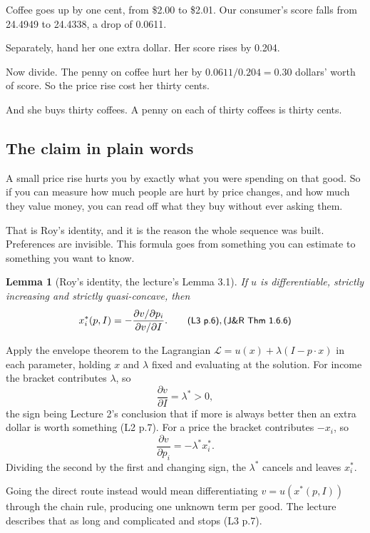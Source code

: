 \documentclass[11pt,letterpaper]{article}
\theoremstyle{definition}
\theoremstyle{plain}
\newtheorem{lem}{Lemma}
\newcommand{\src}[1]{{\small\textsf{(#1)}}}
\newcommand{\skipnote}{\noindent{\small\textsf{Proof. Skippable on a first read.}}\par\smallskip}
\begin{document}
Coffee goes up by one cent, from \$2.00 to \$2.01. Our consumer's score falls from 24.4949 to
24.4338, a drop of 0.0611.

Separately, hand her one extra dollar. Her score rises by 0.204.

Now divide. The penny on coffee hurt her by $0.0611 / 0.204 = 0.30$ dollars' worth of score. So the
price rise cost her thirty cents.

And she buys thirty coffees. A penny on each of thirty coffees is thirty cents.

\subsection{The claim in plain words}

A small price rise hurts you by exactly what you were spending on that good. So if you can measure
how much people are hurt by price changes, and how much they value money, you can read off what they
buy without ever asking them.

That is Roy's identity, and it is the reason the whole sequence was built. Preferences are invisible.
This formula goes from something you can estimate to something you want to know.

\begin{lem}[Roy's identity, the lecture's Lemma 3.1] \label{lem:roy}
If $u$ is differentiable, strictly increasing and strictly quasi-concave, then
\[
x_i^*(p,I) = - \frac{\partial v / \partial p_i}{\partial v / \partial I} .
\qquad \src{L3 p.6}, \src{J\&R Thm 1.6.6}
\]
\end{lem}

\skipnote
\begin{leftbar}
\small
Apply the envelope theorem to the Lagrangian
$\mathcal{L} = u(x) + \lambda(I - p \cdot x)$ in each parameter, holding $x$ and $\lambda$ fixed and
evaluating at the solution. For income the bracket contributes $\lambda$, so
\[
\frac{\partial v}{\partial I} = \lambda^* > 0,
\]
the sign being Lecture 2's conclusion that if more is always better then an extra dollar is worth
something \src{L2 p.7}. For a price the bracket contributes $-x_i$, so
\[
\frac{\partial v}{\partial p_i} = - \lambda^* x_i^* .
\]
Dividing the second by the first and changing sign, the $\lambda^*$ cancels and leaves $x_i^*$.
\end{leftbar}

Going the direct route instead would mean differentiating $v = u(x^*(p,I))$ through the chain rule,
producing one unknown term per good. The lecture describes that as long and complicated and stops
\src{L3 p.7}.
\end{document}
